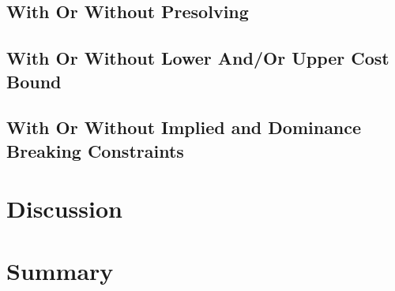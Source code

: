 \subsection{With Or Without Presolving}
\subsection{With Or Without Lower And/Or Upper Cost Bound}
\subsection{With Or Without Implied and Dominance Breaking Constraints}

\section{Discussion}


\section{Summary}

